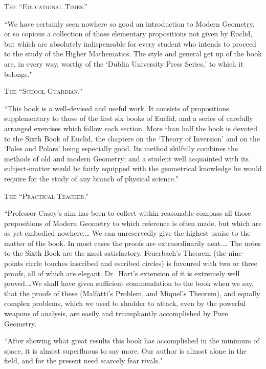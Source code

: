 \documentclass[oneside]{book}
\begin{document}
\bigskip
\begin{center}
\textsc{The ``Educational Times.''}
\end{center}
\nopagebreak

\begin{footnotesize}
``We have certainly seen nowhere so good an introduction to
Modern Geometry, or so copious a collection of those elementary
propositions not given by Euclid, but which are absolutely indispensable
for every student who intends to proceed to the study of
the Higher Mathematics. The style and general get up of the
book are, in every way, worthy of the `Dublin University Press
Series,' to which it belongs."
\end{footnotesize}

\bigskip
\begin{center}
\textsc{The ``School Guardian.''}
\end{center}
\nopagebreak

\begin{footnotesize}
``This book is a well-devised and useful work. It consists of
propositions supplementary to those of the first six books of
Euclid, and a series of carefully arranged exercises which follow
each section. More than half the book is devoted to the Sixth
Book of Euclid, the chapters on the `Theory of Inversion' and
on the `Poles and Polars' being especially good. Its method
skilfully combines the methods of old and modern Geometry; and
a student well acquainted with its subject-matter would be fairly
equipped with the geometrical knowledge he would require for
the study of any branch of physical science."
\end{footnotesize}

\bigskip
\begin{center}
\textsc{The ``Practical Teacher.''}
\end{center}
\nopagebreak

\begin{footnotesize}
``Professor Casey's aim has been to collect within reasonable
compass all those propositions of Modern Geometry to which
reference is often made, but which are as yet embodied nowhere.\ldots
We can unreservedly give the highest praise to the matter
of the book. In most cases the proofs are extraordinarily neat.\ldots
The notes to the Sixth Book are the most satisfactory.
Feuerbach's Theorem (the nine-points circle touches inscribed
and escribed circles) is favoured with two or three proofs, all of
which are elegant. Dr.~Hart's extension of it is extremely well
proved.\ldots We shall have given sufficient commendation
to the book when we say, that the proofs of these (Malfatti's
Problem, and Miquel's Theorem), and equally complex problems,
which we used to shudder to attack, even by the powerful weapons
of analysis, are easily and triumphantly accomplished by
Pure Geometry.

``After showing what great results this book has accomplished
in the minimum of space, it is almost superfluous to say more.
Our author is almost alone in the field, and for the present need
scarcely fear rivals."
\end{footnotesize}
\end{document}
